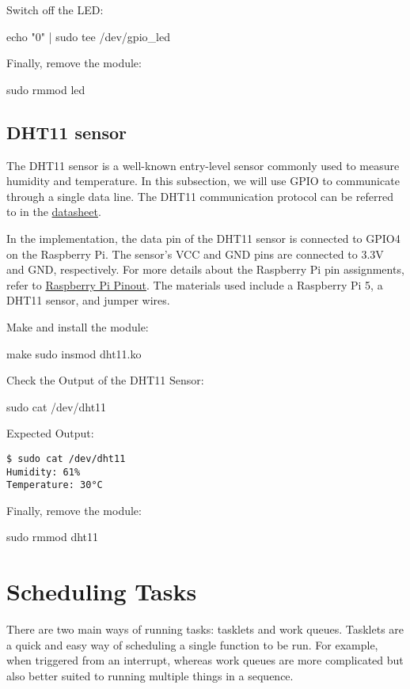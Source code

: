 \documentclass[10pt, oneside]{book}
\begin{document}
Switch off the LED:
\begin{codebash}
echo "0" | sudo tee /dev/gpio_led
\end{codebash}

Finally, remove the module:
\begin{codebash}
sudo rmmod led
\end{codebash}

\subsection{DHT11 sensor}
\label{sec:gpio_dht11}
The DHT11 sensor is a well-known entry-level sensor commonly used to measure humidity and temperature.
In this subsection, we will use GPIO to communicate through a single data line.
The DHT11 communication protocol can be referred to in the \href{https://www.mouser.com/datasheet/2/758/DHT11-Technical-Data-Sheet-Translated-Version-1143054.pdf?srsltid=AfmBOoppls-QTd864640bVtbK90sWBsFzJ_7SgjOD2EpwuLLGUSTyYnv}{datasheet}.

In the implementation, the data pin of the DHT11 sensor is connected to GPIO4 on the Raspberry Pi.
The sensor's VCC and GND pins are connected to 3.3V and GND, respectively.
For more details about the Raspberry Pi pin assignments, refer to \href{https://pinout.xyz/}{Raspberry Pi Pinout}.
The materials used include a Raspberry Pi 5, a DHT11 sensor, and jumper wires.

Make and install the module:
\begin{codebash}
make
sudo insmod dht11.ko
\end{codebash}

Check the Output of the DHT11 Sensor:
\begin{codebash}
sudo cat /dev/dht11
\end{codebash}

Expected Output:
\begin{verbatim}
$ sudo cat /dev/dht11
Humidity: 61%
Temperature: 30°C
\end{verbatim}

Finally, remove the module:
\begin{codebash}
sudo rmmod dht11
\end{codebash}

\section{Scheduling Tasks}
\label{sec:scheduling_tasks}
There are two main ways of running tasks: tasklets and work queues.
Tasklets are a quick and easy way of scheduling a single function to be run.
For example, when triggered from an interrupt,
whereas work queues are more complicated but also better suited to running multiple things in a sequence.
\end{document}

